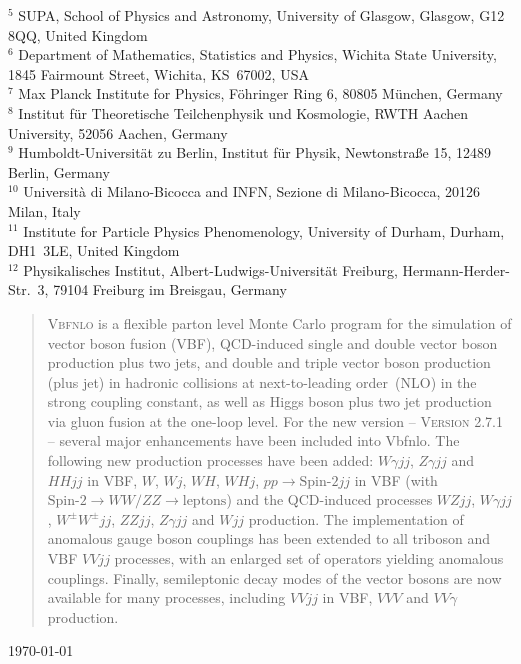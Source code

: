 \documentclass[english,12pt]{article}
\begin{document}
\begin{titlepage}
\begin{center}
$^{5}$ SUPA, School of Physics and Astronomy, University of Glasgow, Glasgow, G12 8QQ, United Kingdom \\ \noindent
$^{6}$ Department of Mathematics, Statistics and Physics, Wichita State University, 1845 Fairmount Street, Wichita, KS\ 67002, USA\\ \noindent
$^{7}$ Max Planck Institute for Physics, F\"{o}hringer Ring 6, 80805 M\"{u}nchen, Germany\\ \noindent
$^{8}$ Institut f\"{u}r Theoretische Teilchenphysik und Kosmologie, RWTH Aachen University, 52056 Aachen, Germany  \\ \noindent
$^{9}$ Humboldt-Universit\"{a}t zu Berlin, Institut f\"{u}r Physik, Newtonstra{\ss}e 15, 12489 Berlin, Germany \\ \noindent
$^{10}$ Universit\`a di Milano-Bicocca and INFN, Sezione di Milano-Bicocca, 20126 Milan, Italy\\ \noindent
$^{11}$ Institute for Particle Physics Phenomenology, University of Durham, Durham, DH1~3LE, United Kingdom \\ \noindent
$^{12}$ Physikalisches Institut, Albert-Ludwigs-Universit\"{a}t Freiburg, Hermann-Herder-Str.\ 3, 79104 Freiburg im Breisgau, Germany \\ \noindent
\noindent
\end{center}
\vspace{0.6cm}

\newpage

\begin{abstract}

\noindent
\textsc{Vbfnlo} is a flexible parton level Monte Carlo program for the
simulation of vector boson fusion (VBF), QCD-induced single and double
vector boson production plus two jets, and double and triple vector
boson production (plus jet) in hadronic collisions at next-to-leading
order~(NLO) in the strong coupling constant, as well as Higgs boson plus
two jet production via gluon fusion at the one-loop level.  For the new
version -- \textsc{Version 2.7.1} -- several major enhancements have
been included into {\sc Vbfnlo}.  The following new production processes have been
added: $W\gamma jj$, $Z\gamma jj$ and $HHjj$ in VBF, $W$, $Wj$, $WH$, $WHj$,
$pp\to \text{Spin-2}jj$ in VBF (with $\text{Spin-2}\to WW/ZZ\to
\text{leptons}$) and the QCD-induced processes $WZjj$, $W\gamma jj$, $W^\pm
W^\pm jj$, $ZZjj$, $Z\gamma jj$ and $Wjj$ production. 
The implementation of anomalous gauge boson couplings 
has been extended to all triboson and VBF $VVjj$ processes, with an
enlarged set of operators yielding anomalous couplings.  Finally,
semileptonic decay modes of the vector bosons are now available for many
processes, including $VVjj$ in VBF, $VVV$ and $VV\gamma$ production.
\end{abstract}
\vspace{2 cm}
\today
\end{titlepage}
\end{document}
